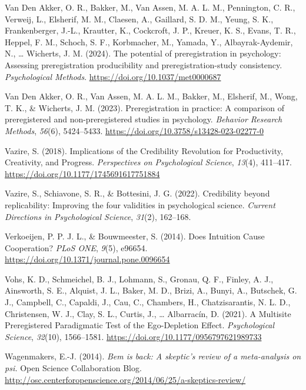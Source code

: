 \documentclass[
  letterpaper,
]{book}
\newlength{\cslhangindent}
\newenvironment{CSLReferences}[2] %
 {\begin{list}{}{%
  \setlength{\itemindent}{0pt}
  \setlength{\leftmargin}{0pt}
  \setlength{\parsep}{0pt}
  \ifodd #1
   \setlength{\leftmargin}{\cslhangindent}
   \setlength{\itemindent}{-1\cslhangindent}
  \fi
  \setlength{\itemsep}{#2\baselineskip}}}
 {\end{list}}
\begin{document}
\begin{CSLReferences}{1}{0}
Van Den Akker, O. R., Bakker, M., Van Assen, M. A. L. M., Pennington, C.
R., Verweij, L., Elsherif, M. M., Claesen, A., Gaillard, S. D. M.,
Yeung, S. K., Frankenberger, J.-L., Krautter, K., Cockcroft, J. P.,
Kreuer, K. S., Evans, T. R., Heppel, F. M., Schoch, S. F., Korbmacher,
M., Yamada, Y., Albayrak-Aydemir, N., \ldots{} Wicherts, J. M. (2024).
The potential of preregistration in psychology: {Assessing}
preregistration producibility and preregistration-study consistency.
\emph{Psychological Methods}. \url{https://doi.org/10.1037/met0000687}

Van Den Akker, O. R., Van Assen, M. A. L. M., Bakker, M., Elsherif, M.,
Wong, T. K., \& Wicherts, J. M. (2023). Preregistration in practice: {A}
comparison of preregistered and non-preregistered studies in psychology.
\emph{Behavior Research Methods}, \emph{56}(6), 5424--5433.
\url{https://doi.org/10.3758/s13428-023-02277-0}

Vazire, S. (2018). Implications of the Credibility Revolution for
Productivity, Creativity, and Progress. \emph{Perspectives on
Psychological Science}, \emph{13}(4), 411--417.
\url{https://doi.org/10.1177/1745691617751884}

Vazire, S., Schiavone, S. R., \& Bottesini, J. G. (2022). Credibility
beyond replicability: Improving the four validities in psychological
science. \emph{Current Directions in Psychological Science},
\emph{31}(2), 162--168.

Verkoeijen, P. P. J. L., \& Bouwmeester, S. (2014). Does {Intuition}
{Cause} {Cooperation}? \emph{PLoS ONE}, \emph{9}(5), e96654.
\url{https://doi.org/10.1371/journal.pone.0096654}

Vohs, K. D., Schmeichel, B. J., Lohmann, S., Gronau, Q. F., Finley, A.
J., Ainsworth, S. E., Alquist, J. L., Baker, M. D., Brizi, A., Bunyi,
A., Butschek, G. J., Campbell, C., Capaldi, J., Cau, C., Chambers, H.,
Chatzisarantis, N. L. D., Christensen, W. J., Clay, S. L., Curtis, J.,
\ldots{} Albarracín, D. (2021). A Multisite Preregistered Paradigmatic
Test of the Ego-Depletion Effect. \emph{Psychological Science},
\emph{32}(10), 1566--1581.
\url{https://doi.org/10.1177/0956797621989733}

Wagenmakers, E.-J. (2014). \emph{Bem is back: A skeptic's review of a
meta-analysis on psi.} Open Science Collaboration Blog.
\url{http://osc.centerforopenscience.org/2014/06/25/a-skeptics-review/}


\end{CSLReferences}
\end{document}
